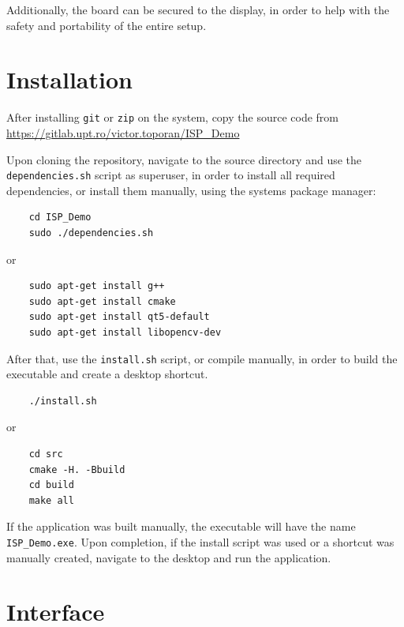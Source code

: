 Additionally, the board can be secured to the display, in order to help with the safety and portability of the
entire setup.

\section{Installation}

After installing \verb|git| or \verb|zip| on the system, copy the source code from
\url{https://gitlab.upt.ro/victor.toporan/ISP_Demo}

Upon cloning the repository, navigate to the source directory and use the \verb|dependencies.sh| script as superuser,
in order to install all required dependencies, or install them manually, using the systems package manager:
\begin{code}
	\begin{lstlisting}
    cd ISP_Demo
    sudo ./dependencies.sh
    \end{lstlisting}
	or
	\begin{lstlisting}
    sudo apt-get install g++
    sudo apt-get install cmake
    sudo apt-get install qt5-default
    sudo apt-get install libopencv-dev
    \end{lstlisting}
\end{code}

After that, use the \verb|install.sh| script, or compile manually, in order to build the executable and create
a desktop shortcut.

\begin{code}
	\begin{lstlisting}
    ./install.sh
    \end{lstlisting}
	or
	\begin{lstlisting}
    cd src
    cmake -H. -Bbuild
    cd build
    make all
    \end{lstlisting}
\end{code}

If the application was built manually, the executable will have the name \verb|ISP_Demo.exe|.
Upon completion, if the install script was used or a shortcut was manually created, navigate to the desktop and
run the application.

\pagebreak
\section{Interface}

